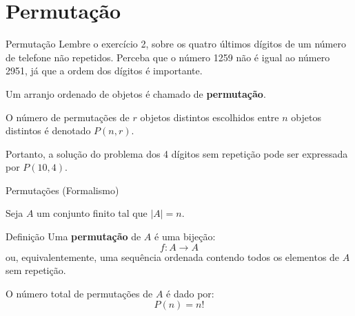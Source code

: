 \documentclass[9pt]{beamer}
\begin{document}
\section{Permutação}
\begin{frame}{Permutação}
Lembre o exercício 2, sobre os quatro últimos dígitos de um número de telefone não repetidos. Perceba que o número 1259 não é igual ao número 2951, já que a ordem dos dígitos é importante.
\vspace{0.3cm}

Um arranjo ordenado de objetos é chamado de \textbf{permutação}.
\vspace{0.1cm}

\begin{center}
\end{center}

O número de permutações de $r$ objetos distintos escolhidos entre $n$ objetos distintos é denotado $P(n,r)$.
\vspace{0.1cm}

Portanto, a solução do problema dos 4 dígitos sem repetição pode ser expressada por $P(10, 4)$.
\end{frame}


\begin{frame}{Permutações (Formalismo)}

Seja $A$ um conjunto finito tal que $|A| = n$.

\vspace{0.3cm}

\begin{block}{Definição}
Uma \textbf{permutação} de $A$ é uma bijeção:
\[
f: A \rightarrow A
\]
ou, equivalentemente, uma sequência ordenada contendo todos os elementos de $A$ sem repetição.
\end{block}

\vspace{0.4cm}

O número total de permutações de $A$ é dado por:
\[
P(n) = n!
\]


\end{frame}
\end{document}
